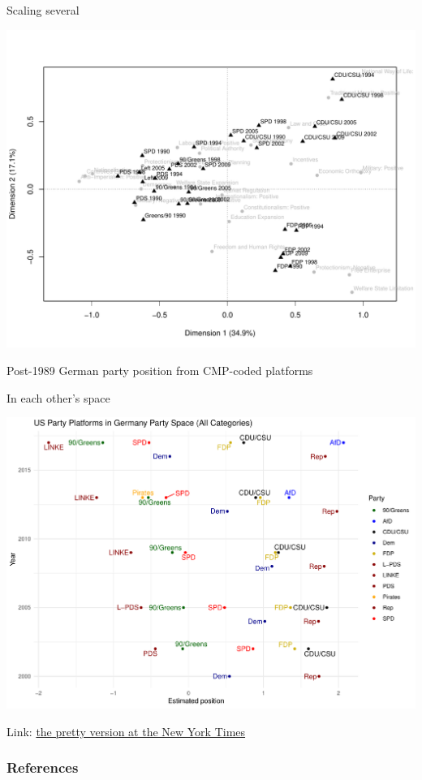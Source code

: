 \documentclass{hertieteaching}
\begin{document}


\begin{frame}{Scaling several}
\vspace{-1em}
\centerline{\includegraphics[scale=0.45]{pictures/grey-just-rile}}
Post-1989 German party position from CMP-coded platforms

\end{frame}

\begin{frame}{In each other's space}
\medskip
\centerline{\includegraphics[scale=.35]{pictures/cmpcats_us_in_de}}
Link: \href{https://www.nytimes.com/interactive/2019/06/26/opinion/sunday/republican-platform-far-right.html}{the pretty version at the New York Times}

\end{frame}



\begin{frame}[allowframebreaks]
\frametitle{References}
\printbibliography	
\end{frame}
\end{document}
